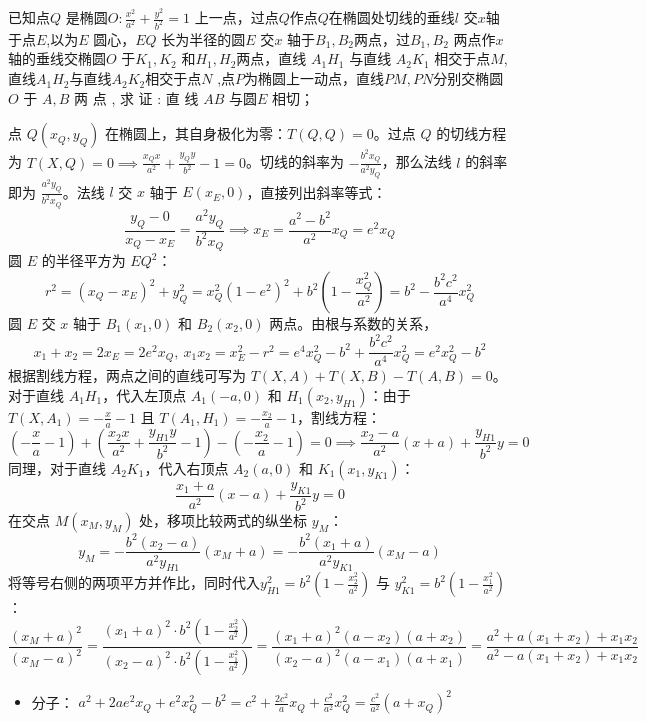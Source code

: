 \begin{exercise}
    已知点$Q$ 是椭圆$O:\frac{x^2}{a^2}+\frac{y^2}{b^2}=1$ 上一点，过点$Q$作点$Q$在椭圆处切线的垂线$l$ 交$x$轴于点$E$,以为$E$ 圆心，$EQ$ 长为半径的圆$E$ 交$x$ 轴于$B_1,B_2$两点，过$B_1,B_2$ 两点作$x$ 轴的垂线交椭圆$O$ 于$K_1,K_2$ 和$H_1,H_2$两点，直线 $A_1H_1$ 与直线 $A_2K_1$ 相交于点$M$,直线$A_1H_2$与直线$A_2K_2$相交于点$N$ ,点$P$为椭圆上一动点，直线$PM,PN$分别交椭圆$O$ 于 $A, B$ 两 点 , 求 证 : 直 线  $AB$ 与圆$E$ 相切；
\end{exercise}
\begin{solution}
点 $Q(x_Q, y_Q)$ 在椭圆上，其自身极化为零：$T(Q,Q) = 0$。过点 $Q$ 的切线方程为 $T(X,Q) = 0 \implies \frac{x_Q x}{a^2} + \frac{y_Q y}{b^2} - 1 = 0$。切线的斜率为 $-\frac{b^2 x_Q}{a^2 y_Q}$，那么法线 $l$ 的斜率即为 $\frac{a^2 y_Q}{b^2 x_Q}$。法线 $l$ 交 $x$ 轴于 $E(x_E, 0)$，直接列出斜率等式：
$$\frac{y_Q - 0}{x_Q - x_E} = \frac{a^2 y_Q}{b^2 x_Q} \implies x_E = \frac{a^2-b^2}{a^2} x_Q = e^2 x_Q$$
圆 $E$ 的半径平方为 $EQ^2$：$$r^2 = (x_Q - x_E)^2 + y_Q^2 = x_Q^2(1-e^2)^2 + b^2\left(1-\frac{x_Q^2}{a^2}\right) = b^2 - \frac{b^2 c^2}{a^4}x_Q^2$$
圆 $E$ 交 $x$ 轴于 $B_1(x_1, 0)$ 和 $B_2(x_2, 0)$ 两点。由根与系数的关系，
$$x_1 + x_2 = 2x_E = 2e^2 x_Q,~x_1 x_2 = x_E^2 - r^2 = e^4 x_Q^2 - b^2 + \frac{b^2 c^2}{a^4}x_Q^2 = e^2 x_Q^2 - b^2$$
根据割线方程，两点之间的直线可写为 $T(X,A) + T(X,B) - T(A,B) = 0$。对于直线 $A_1 H_1$，代入左顶点 $A_1(-a, 0)$ 和 $H_1(x_2, y_{H1})$：由于 $T(X, A_1) = -\frac{x}{a}-1$ 且 $T(A_1, H_1) = -\frac{x_2}{a}-1$，割线方程：
$$\left(-\frac{x}{a}-1\right) + \left(\frac{x_2 x}{a^2} + \frac{y_{H1} y}{b^2} - 1\right) - \left(-\frac{x_2}{a}-1\right) = 0 \implies \frac{x_2-a}{a^2}(x+a) + \frac{y_{H1}}{b^2}y = 0$$
同理，对于直线 $A_2 K_1$，代入右顶点 $A_2(a, 0)$ 和 $K_1(x_1, y_{K1})$：
$$\frac{x_1+a}{a^2}(x-a) + \frac{y_{K1}}{b^2}y = 0$$
在交点 $M(x_M, y_M)$ 处，移项比较两式的纵坐标 $y_M$：
$$y_M = -\frac{b^2(x_2-a)}{a^2 y_{H1}}(x_M+a) = -\frac{b^2(x_1+a)}{a^2 y_{K1}}(x_M-a)$$
将等号右侧的两项平方并作比，同时代入$y_{H1}^2 = b^2(1 - \frac{x_2^2}{a^2})$ 与 $y_{K1}^2 = b^2(1 - \frac{x_1^2}{a^2})$：
$$\frac{(x_M+a)^2}{(x_M-a)^2} = \frac{(x_1+a)^2 \cdot b^2\left(1 - \frac{x_2^2}{a^2}\right)}{(x_2-a)^2 \cdot b^2\left(1 - \frac{x_1^2}{a^2}\right)} = \frac{(x_1+a)^2(a-x_2)(a+x_2)}{(x_2-a)^2(a-x_1)(a+x_1)} = \frac{a^2 + a(x_1+x_2) + x_1 x_2}{a^2 - a(x_1+x_2) + x_1 x_2}$$
\begin{itemize}
\item 分子： $a^2 + 2a e^2 x_Q + e^2 x_Q^2 - b^2 = c^2 + \frac{2c^2}{a}x_Q + \frac{c^2}{a^2}x_Q^2 = \frac{c^2}{a^2}(a+x_Q)^2$

\end{itemize}
\end{solution}
